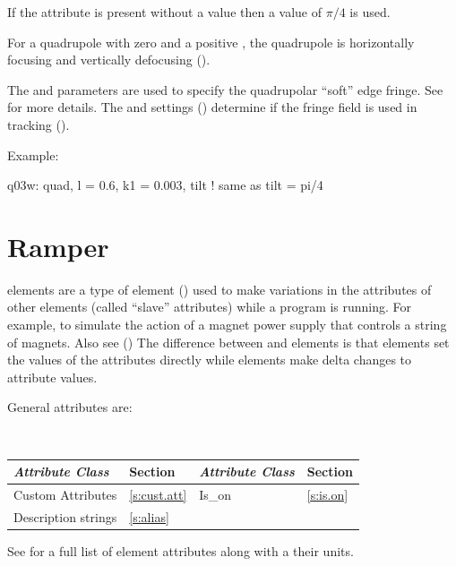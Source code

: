 {
If the  attribute is present without a value then a value of $\pi/4$
is used.

For a quadrupole with zero  and a positive , the
quadrupole is horizontally focusing and vertically defocusing
().

The  and  parameters are used to specify the
quadrupolar ``soft'' edge fringe. See  for more details.
The  and  settings ()
determine if the fringe field is used in tracking ().

Example:
\begin{example}
  q03w: quad, l = 0.6, k1 = 0.003, tilt  ! same as tilt = pi/4
\end{example}

\section{Ramper}
\label{s:ramper}

 elements are a type of  element () used to make
variations in the attributes of other elements (called ``slave'' attributes) while a program is
running. For example, to simulate the action of a magnet power supply that controls a string of
magnets. Also see  () The difference between  and 
elements is that  elements set the values of the attributes directly while 
elements make delta changes to attribute values.

General  attributes are:
\begin{center}
\tt
\begin{tabular}{llll} \toprule
  {\sl Attribute Class}      & Section           & {\sl Attribute Class}      & Section         \\ \midrule
  Custom Attributes          & \ref{s:cust.att}  & Is_on                      & \ref{s:is.on}   \\
  Description strings        & \ref{s:alias}     &                            &                 \\ 
  \bottomrule
\end{tabular}
\end{center}
\toffset
See  for a full list of element attributes along with a their units.

}
